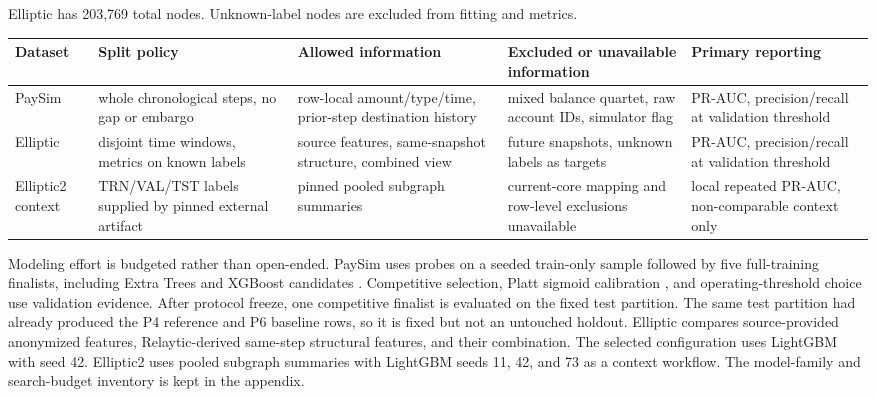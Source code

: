 \documentclass[11pt]{article}
\begin{document}
Elliptic has 203,769 total nodes. Unknown-label nodes are excluded from fitting and metrics.

\begin{center}
\begin{minipage}{\linewidth}
\scriptsize
\setlength{\tabcolsep}{3pt}
\renewcommand{\arraystretch}{1.16}
\begin{tabularx}{\linewidth}{@{}>{\raggedright\arraybackslash}X >{\raggedright\arraybackslash}X >{\raggedright\arraybackslash}X >{\raggedright\arraybackslash}X >{\raggedright\arraybackslash}X@{}}
\toprule
Dataset & Split policy & Allowed information & Excluded or unavailable information & Primary reporting \\
\midrule
PaySim & whole chronological steps, no gap or embargo & row-local amount/type/time, prior-step destination history & mixed balance quartet, raw account IDs, simulator flag & PR-AUC, precision/recall at validation threshold \\
Elliptic & disjoint time windows, metrics on known labels & source features, same-snapshot structure, combined view & future snapshots, unknown labels as targets & PR-AUC, precision/recall at validation threshold \\
\mbox{Elliptic2} context & TRN/VAL/TST labels supplied by pinned external artifact & pinned pooled subgraph summaries & current-core mapping and row-level exclusions unavailable & local repeated PR-AUC, non-comparable context only \\
\bottomrule
\end{tabularx}
\end{minipage}
\end{center}


Modeling effort is budgeted rather than open-ended. PaySim uses probes on a seeded train-only sample followed by five full-training finalists, including Extra Trees and XGBoost candidates \citep{geurts2006extratrees,chen2016xgboost}. Competitive selection, Platt sigmoid calibration \citep{platt1999probabilistic}, and operating-threshold choice use validation evidence. After protocol freeze, one competitive finalist is evaluated on the fixed test partition. The same test partition had already produced the P4 reference and P6 baseline rows, so it is fixed but not an untouched holdout. Elliptic compares source-provided anonymized features, Relaytic-derived same-step structural features, and their combination. The selected configuration uses LightGBM \citep{ke2017lightgbm} with seed 42. \mbox{Elliptic2} uses pooled subgraph summaries with LightGBM seeds 11, 42, and 73 as a context workflow. The model-family and search-budget inventory is kept in the appendix.
\end{document}

